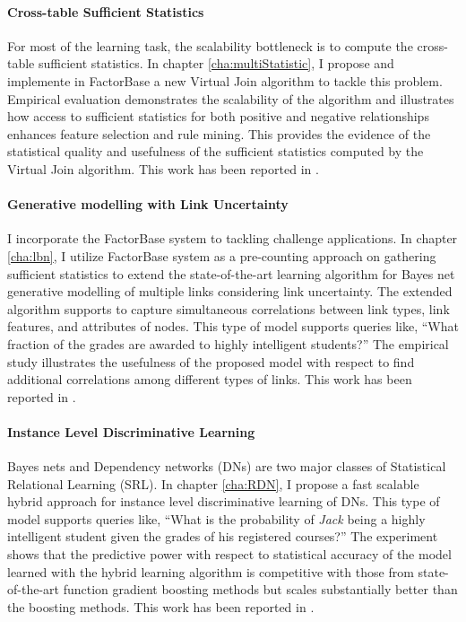 \documentclass{sfuthesis}
\begin{document}
\paragraph {Cross-table Sufficient Statistics} For most of the learning task, the scalability bottleneck is to compute the cross-table sufficient statistics.  In chapter \ref{cha:multiStatistic}, I propose and implemente in FactorBase a new Virtual Join algorithm  to tackle this problem.  Empirical evaluation demonstrates the scalability of the algorithm and illustrates how access to sufficient statistics for both positive and negative relationships enhances feature selection and rule mining. This provides the evidence of the statistical quality and usefulness of the sufficient statistics computed by the Virtual Join algorithm. This work has been reported in \cite{Qian2014a,  Qian2014}.

\paragraph  {Generative modelling with Link Uncertainty} %
I incorporate the FactorBase system to tackling challenge applications. In chapter \ref{cha:lbn}, I utilize FactorBase system as a pre-counting approach on gathering sufficient statistics to extend the state-of-the-art learning algorithm for Bayes net generative modelling of multiple links considering link uncertainty. The extended algorithm supports  to capture simultaneous correlations between link types, link features, and attributes of nodes. This type of model supports queries like, ``What fraction of the grades are awarded to highly intelligent students?'' The empirical study illustrates the usefulness of the proposed model with respect to find additional correlations among different types of links. This work has been reported in \cite{Qian_LNAI_2014, Qian2014}.

\paragraph {Instance Level Discriminative Learning}%
Bayes nets and Dependency networks (DNs) are two major classes of Statistical Relational Learning (SRL).  In chapter \ref{cha:RDN},  I propose a fast scalable hybrid approach for instance level discriminative learning of DNs.  This type of model supports queries like, ``What is the probability of {\em Jack} being a highly intelligent student given the grades of his registered courses?'' The experiment shows that the predictive power with respect to statistical accuracy of the model learned with the hybrid learning algorithm
is competitive with those from state-of-the-art function gradient boosting methods but scales substantially better than the boosting methods. This work has been reported in \cite{Schulte2014a, Schulte2016}.
\end{document}
